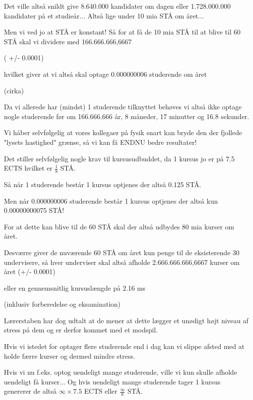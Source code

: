 \documentclass[a4paper,11pt]{article}
\begin{document}
\begin{sketch}
 Det ville altså snildt give 8.640.000 kandidater om dagen eller
1.728.000.000 kandidater på et studieår... Altså lige under 10 mia STÅ
om året...

 Men vi ved jo at STÅ er konstant! Så for at få de 10 mia STÅ til at
blive til 60 STÅ skal vi dividere med 166.666.666,6667 

( +/- 0.0001)

 hvilket giver at vi altså skal optage 0.000000006 studerende om året

 (cirka)

 Da vi allerede har (mindst) 1 studerende tilknyttet behøves vi
altså ikke optage nogle studerende før om 166.666.666 år, 8 måneder,
17 minutter og 16.8 sekunder.

 Vi håber selvfølgelig at vores kollegaer på fysik snart kan bryde
den der fjollede "lysets hastighed" grænse, så vi kan få ENDNU bedre
resultater!


 Det stiller selvfølgelig nogle krav til kursusudbuddet, da 1 kursus
jo er på 7.5 ECTS hvilket er $\frac{1}{8}$ STÅ.

 Så når 1 studerende består 1 kursus optjenes der altså 0.125 STÅ.

 Men når 0.000000006 studerende består 1 kursus optjenes der altså
kun 0.00000000075 STÅ!

 For at dette kan blive til de 60 STÅ skal der altså udbydes 80 mia
kurser om året.

 Desværre giver de nuværende 60 STÅ om året kun penge til de
eksisterende 30 undervisere, så hver underviser skal altså afholde
2.666.666.666,6667 kurser om året
 (+/- 0.0001) 

  eller en gennemsnitlig kursuslængde på 2.16 ms 

 (inklusiv forberedelse og eksamination)


 Lærerstaben har dog udtalt at de mener at dette lægger et unødigt
højt niveau af stress på dem og er derfor kommet med et modspil.

 Hvis vi istedet for optager flere studerende end i dag kan vi
slippe afsted med at holde færre kurser og dermed mindre stress.

 Hvis vi nu f.eks. optog uendeligt mange studerende, ville vi kun
skulle afholde uendeligt få kurser... Og hvis uendeligt mange
studerende tager 1 kursus genererer de altså $\infty \times 7.5$ ECTS eller
$\frac{\infty}{8}$ STÅ.


\end{sketch}
\end{document}
